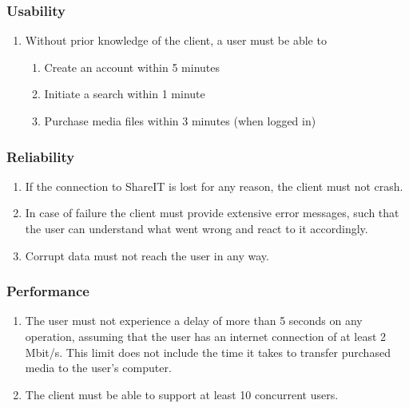 \documentclass[../report.tex]{subfiles}
\begin{document}

\label{sec:Non-functional Requirements}

\subsubsection{Usability}

\begin{enumerate}[label=\textbf{NFR-\twodigits*}]
\item Without prior knowledge of the client, a user must be able to
	\begin{enumerate}
	\item Create an account within 5 minutes
	\item Initiate a search within 1 minute
	\item Purchase media files within 3 minutes (when logged in)
	\end{enumerate}
\end{enumerate}

\subsubsection{Reliability}

\begin{enumerate}[label=\textbf{NFR-\twodigits*}, resume]
\item If the connection to ShareIT is lost for any reason, the client must not crash. 
\item In case of failure the client must provide extensive error messages, such that the user can understand what went wrong and react to it accordingly.
\item Corrupt data must not reach the user in any way.
\end{enumerate}

\subsubsection{Performance}

\begin{enumerate}[label=\textbf{NFR-\twodigits*}, resume]
\item The user must not experience a delay of more than 5 seconds on any operation, assuming that the user has an internet connection of at least 2 Mbit/s. This limit does not include the time it takes to transfer purchased media to the user's computer.
\item The client must be able to support at least 10 concurrent users. 
\end{enumerate}
\end{document}
